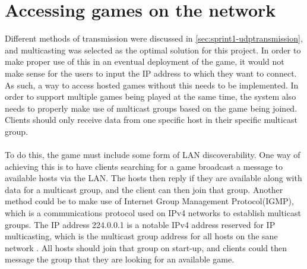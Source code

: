 \section{Accessing games on the network}
Different methods of transmission were discussed in \autoref{sec:sprint1-udptransmission}, and multicasting was selected as the optimal solution for this project.
In order to make proper use of this in an eventual deployment of the game, it would not make sense for the users to input the IP address to which they want to connect.
As such, a way to access hosted games without this needs to be implemented.
In order to support multiple games being played at the same time, the system also needs to properly make use of multicast groups based on the game being joined.
Clients should only receive data from one specific host in their specific multicast group.
\\\\
To do this, the game must include some form of LAN discoverability.
One way of achieving this is to have clients searching for a game broadcast a message to available hosts via the LAN.
The hosts then reply if they are available along with data for a multicast group, and the client can then join that group.
Another method could be to make use of Internet Group Management Protocol(IGMP), which is a communications protocol used on IPv4 networks to establish multicast groups.
The IP address 224.0.0.1 is a notable IPv4 address reserved for IP multicasting, which is the multicast group address for all hosts on the sane network \cite{ipv4multicastaddresses}.
All hosts should join that group on start-up, and clients could then message the group that they are looking for an available game.
